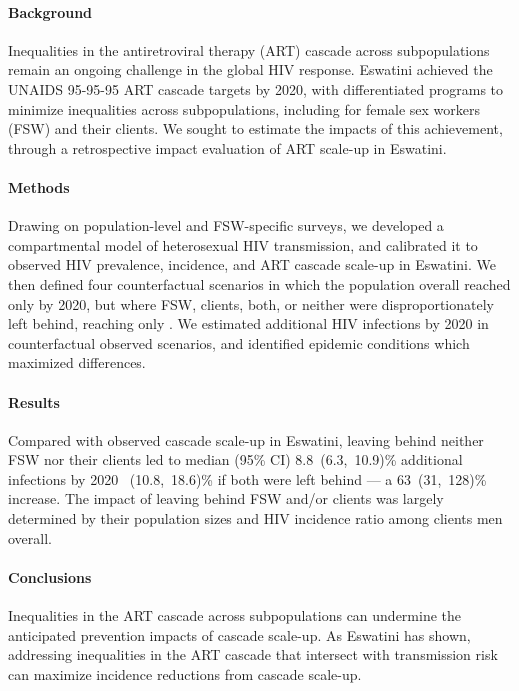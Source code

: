 \paragraph{Background}
Inequalities in the antiretroviral therapy (ART) cascade across subpopulations
remain an ongoing challenge in the global HIV response.
Eswatini achieved the UNAIDS 95-95-95 ART cascade targets by 2020,
with differentiated programs to minimize inequalities across subpopulations,
including for female sex workers (FSW) and their clients.
We sought to estimate the impacts of this achievement,
through a retrospective impact evaluation of ART scale-up in Eswatini.
\paragraph{Methods}
Drawing on population-level and FSW-specific surveys,
we developed a compartmental model of heterosexual HIV transmission,
and calibrated it to observed
HIV prevalence, incidence, and ART cascade scale-up in Eswatini.
We then defined four counterfactual scenarios in which
the population overall reached only \casmd by 2020,
but where FSW, clients, both, or neither
were disproportionately left behind, reaching only \caslo.
We estimated additional HIV infections by 2020
in counterfactual \vs observed scenarios,
and identified epidemic conditions which maximized differences.
\paragraph{Results}
Compared with observed cascade scale-up in Eswatini,
leaving behind neither FSW nor their clients led to median (95\% CI)
8.8~(6.3,~10.9)\% additional infections by 2020 ~(10.8,~18.6)\% if both were left behind %
--- a 63~(31,~128)\% increase. %
The impact of leaving behind FSW and/or clients was largely determined by
their population sizes and HIV incidence ratio among clients \vs men overall.
\paragraph{Conclusions}
Inequalities in the ART cascade across subpopulations
can undermine the anticipated prevention impacts of cascade scale-up.
As Eswatini has shown,
addressing inequalities in the ART cascade that intersect with transmission risk
can maximize incidence reductions from cascade scale-up.
